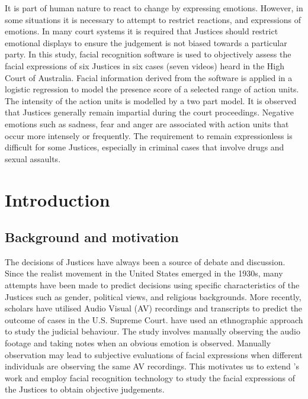 \documentclass{monashthesis}
\begin{document}
It is part of human nature to react to change by expressing emotions. However, in some situations it is necessary to attempt to restrict reactions, and expressions of emotions.
In many court systems it is required that Justices should restrict emotional displays to ensure the judgement is not biased towards a particular party. In this study, facial recognition software is used to objectively assess the facial expressions of six Justices in six cases (seven videos) heard in the High Court of Australia. Facial information derived from the software is applied in a logistic regression to model the presence score of a selected range of action units. The intensity of the action units is modelled by a two part model. It is observed that Justices generally remain impartial during the court proceedings. Negative emotions such as sadness, fear and anger are associated with action units that occur more intensely or frequently. The requirement to remain expressionless is difficult for some Justices, especially in criminal cases that involve drugs and sexual assaults.

\clearpage{}\setcounter{page}{1}
\let\cleardoublepage\clearpage

\hypertarget{ch:intro}{%
\chapter{Introduction}\label{ch:intro}}

\hypertarget{background-and-motivation}{%
\section{Background and motivation}\label{background-and-motivation}}

The decisions of Justices have always been a source of debate and discussion. Since the realist movement in the United States emerged in the 1930s, many attempts have been made to predict decisions using specific characteristics of the Justices such as gender, political views, and religious backgrounds. More recently, scholars \autocites{Shullman2004illusion}{chen2016justice} have utilised Audio Visual (AV) recordings and transcripts to predict the outcome of cases in the U.S. Supreme Court. \textcite{tutton2018judicial} have used an ethnographic approach to study the judicial behaviour. The study involves manually observing the audio footage and taking notes when an obvious emotion is observed. Manually observation may lead to subjective evaluations of facial expressions when different individuals are observing the same AV recordings. This motivates us to extend \textcite{tutton2018judicial}'s work and employ facial recognition technology to study the facial expressions of the Justices to obtain objective judgements.
\end{document}

